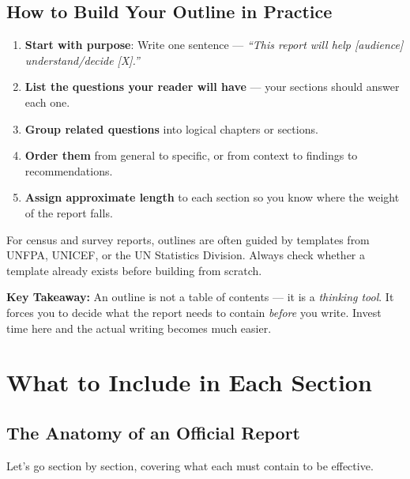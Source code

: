 \documentclass[11pt,a4paper,oneside]{book}
\begin{document}
\section{How to Build Your Outline in Practice}

\begin{enumerate}
    \item \textbf{Start with purpose}: Write one sentence --- \emph{``This report will help [audience] understand/decide [X].''}
    \item \textbf{List the questions your reader will have} --- your sections should answer each one.
    \item \textbf{Group related questions} into logical chapters or sections.
    \item \textbf{Order them} from general to specific, or from context to findings to recommendations.
    \item \textbf{Assign approximate length} to each section so you know where the weight of the report falls.
\end{enumerate}

\begin{tcolorbox}[nsolightbox, colframe=nsored, title=\textbf{NSO Nepal Tip}]
    For census and survey reports, outlines are often guided by templates from UNFPA, UNICEF, or the UN Statistics Division. Always check whether a template already exists before building from scratch.
\end{tcolorbox}

\begin{tcolorbox}[nsolightbox]
\textbf{Key Takeaway:} An outline is not a table of contents --- it is a \emph{thinking tool}. It forces you to decide what the report needs to contain \emph{before} you write. Invest time here and the actual writing becomes much easier.
\end{tcolorbox}


\chapter{What to Include in Each Section}

\section{The Anatomy of an Official Report}

Let's go section by section, covering what each must contain to be effective.
\end{document}

